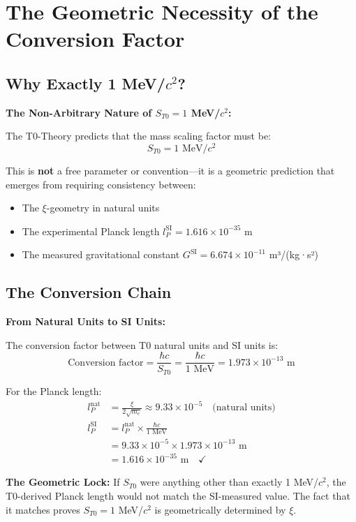 \documentclass[12pt,a4paper]{article}
\begin{document}
	\section{The Geometric Necessity of the Conversion Factor}
	
	\subsection{Why Exactly 1 MeV/$c^2$?}
	
	\begin{keyresult}
		\textbf{The Non-Arbitrary Nature of $S_{T0} = 1$ MeV/$c^2$:}
		
		The T0-Theory predicts that the mass scaling factor must be:
		\begin{equation}
			\boxed{S_{T0} = 1 \text{ MeV}/c^2}
		\end{equation}
		
		This is \textbf{not} a free parameter or convention—it is a geometric prediction that emerges from requiring consistency between:
		\begin{itemize}
			\item The $\xi$-geometry in natural units
			\item The experimental Planck length $l_P^{\text{SI}} = 1.616 \times 10^{-35}$ m
			\item The measured gravitational constant $G^{\text{SI}} = 6.674 \times 10^{-11}$ m³/(kg·s²)
		\end{itemize}
	\end{keyresult}
	
	\subsection{The Conversion Chain}
	
	\begin{derivation}
		\textbf{From Natural Units to SI Units:}
		
		The conversion factor between T0 natural units and SI units is:
		\begin{equation}
			\text{Conversion factor} = \frac{\hbar c}{S_{T0}} = \frac{\hbar c}{1 \text{ MeV}} = 1.973 \times 10^{-13} \text{ m}
		\end{equation}
		
		For the Planck length:
		\begin{align}
			l_P^{\text{nat}} &= \frac{\xi}{2\sqrt{m_e}} \approx 9.33 \times 10^{-5} \quad \text{(natural units)} \\
			l_P^{\text{SI}} &= l_P^{\text{nat}} \times \frac{\hbar c}{1 \text{ MeV}} \\
			&= 9.33 \times 10^{-5} \times 1.973 \times 10^{-13} \text{ m} \\
			&= 1.616 \times 10^{-35} \text{ m} \quad \checkmark
		\end{align}
		
		\textbf{The Geometric Lock:} If $S_{T0}$ were anything other than exactly 1 MeV/$c^2$, the T0-derived Planck length would not match the SI-measured value. The fact that it matches proves $S_{T0} = 1$ MeV/$c^2$ is geometrically determined by $\xi$.
	\end{derivation}
	
\end{document}
